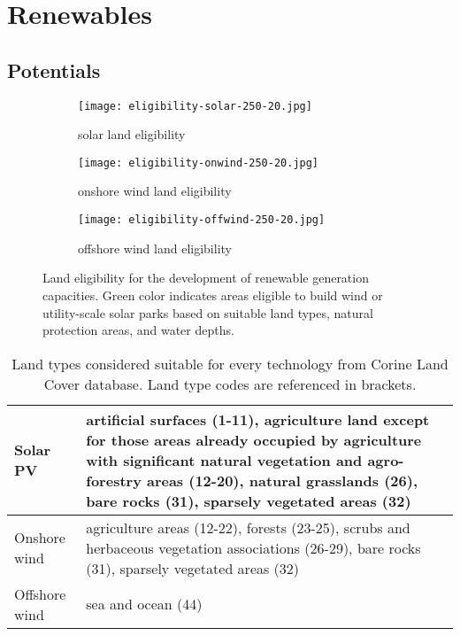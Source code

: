 
\section{Renewables}
\label{sec:si:renewables}

\subsection{Potentials}
\label{sec:si:renewable-potentials}


\begin{figure}
    \centering
    \begin{subfigure}[t]{0.48\textwidth}
            \centering
        \caption{solar land eligibility}
        \texttt{[image: eligibility-solar-250-20.jpg]}
    \end{subfigure}
    \begin{subfigure}[t]{0.48\textwidth}
        \centering
        \caption{onshore wind land eligibility}
        \texttt{[image: eligibility-onwind-250-20.jpg]}
    \end{subfigure}
    \begin{subfigure}[t]{0.48\textwidth}
        \centering
        \vspace{.5cm}
        \caption{offshore wind land eligibility}
        \texttt{[image: eligibility-offwind-250-20.jpg]}
    \end{subfigure}
    \caption{Land eligibility for the development of renewable generation capacities. Green color indicates
    areas eligible to build wind or utility-scale solar parks based on suitable land types, natural protection areas, and water depths.}
    \label{fig:eligibility}
\end{figure}

\begin{table}
    \caption{Land types considered suitable for every technology from Corine Land Cover database. Land type codes are referenced in brackets.}
    \small
    \begin{tabularx}{\textwidth}{lX}
        \toprule
        Solar PV & artificial surfaces (1-11), agriculture land except for those
        areas already occupied by agriculture with significant natural
        vegetation and agro-forestry areas (12-20), natural grasslands (26), bare rocks (31),
        sparsely vegetated areas (32) \\ \midrule
        Onshore wind & agriculture areas (12-22), forests (23-25), scrubs and herbaceous vegetation associations (26-29), bare rocks (31), sparsely vegetated areas (32) \\ \midrule
        Offshore wind & sea and ocean (44) \\ \bottomrule
    \end{tabularx}
    \label{tab:eligibility}
\end{table}

